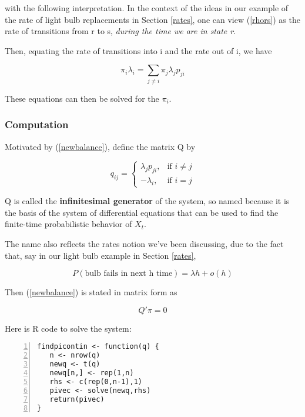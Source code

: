 with the following interpretation.  In the context of the ideas in our
example of the rate of light bulb replacements in Section \ref{rates},
one can view (\ref{rhors}) as the rate of transitions from r to s, {\it
during the time we are in state r}.  

Then, equating the rate of transitions into i and the rate out of i, we
have

\begin{equation}
\label{newbalance}
\pi_i \lambda_i = \sum_{j \neq i} \pi_j \lambda_j p_{ji}
\end{equation}

These equations can then be solved for the $\pi_i$.

\subsubsection{Computation}

Motivated by (\ref{newbalance}), define the matrix Q by

\begin{equation}
q_{ij} = 
\begin{cases}
\lambda_j p_{ji}, & \text{if $i \neq j$}\\
-\lambda_i, & \text{if $i = j$}
\end{cases}
\end{equation}

Q is called the {\bf infinitesimal generator} of the system, so named
because it is the basis of the system of differential equations that can
be used to find the finite-time probabilistic behavior of $X_t$.  

The name also reflects the rates notion we've been discussing, due to
the fact that, say in our light bulb example in Section \ref{rates},

\begin{equation}
P(\textrm{bulb fails in next h time}) = \lambda h + o(h)
\end{equation}

Then (\ref{newbalance}) is stated in matrix form as

\begin{equation}
Q' \pi = 0
\end{equation}

Here is R code to solve the system:

\begin{Verbatim}[fontsize=\relsize{-2},numbers=left]
findpicontin <- function(q) {
   n <- nrow(q)
   newq <- t(q)
   newq[n,] <- rep(1,n)
   rhs <- c(rep(0,n-1),1)
   pivec <- solve(newq,rhs)
   return(pivec)
}
\end{Verbatim}


